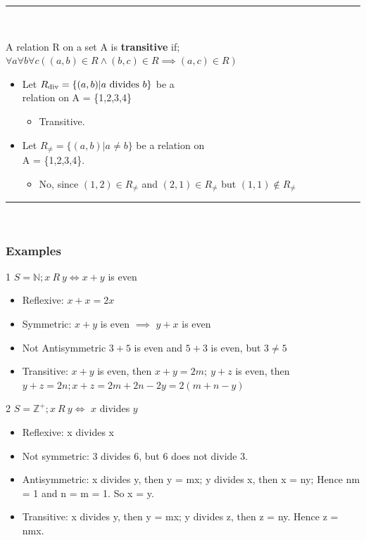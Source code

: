 \documentclass[12pt, letterpaper]{article}
\newcommand{\cul}[1]{%
		\uline{\phantom{#1}}%
		\llap{\contour{white}{#1}}%
	}
\newcommand{\exheader}[1][ex]{{\tiny{#1}\normalsize}}
\newcommand{\horizline}[0]{\noindent\rule{\textwidth}{1pt}\\}
\begin{document}
\horizline
\begin{minipage}[t]{0.5\linewidth}
{\small 
A relation R on a set A is \textbf{transitive} if; \\ $\forall a \forall b \forall c ((a,b) \in R \land (b,c) \in R \implies (a,c) \in R)$
}
\end{minipage}
\begin{minipage}[t]{0.45\textwidth}
{\small 
	\cul{Examples:}
	\begin{itemize}[leftmargin=*, label={}]
		\item Let $R_{\textnormal{div}} = \{(a,b) | a \textnormal{ divides } b\}$ be a \\ relation on A = \{1,2,3,4\}
		\begin{itemize}
			\item Transitive.
		\end{itemize}
		\item Let $R_{\not =} = \{(a,b) | a \not = b\}$ be a relation on \\ A = \{1,2,3,4\}.
		\begin{itemize}
			\item No, since $(1,2) \in R_{\not =}$ and $(2,1) \in R_{\not =}$ but $(1,1) \not \in R_{\not =}$
		\end{itemize}
	\end{itemize}
}
\end{minipage}

\horizline

\pagebreak

\vspace*{-3cm}
\subsubsection*{Examples}
\bigbreak
\exheader[1] $S = \mathbb{N}; x\ R\ y \iff x + y$ is even
\begin{itemize}[leftmargin=*, label={}]
	\item Reflexive: $x + x = 2x$ 
	\item Symmetric: $x + y$ is even $\implies$ $y + x$ is even 
	\item Not Antisymmetric $3 + 5$ is even and $5 + 3$ is even, but $3 \not = 5$ 
	\item Transitive: $x + y$ is even, then $x + y = 2m; \ y + z$ is even, then $y + z = 2n; x + z = 2m + 2n - 2y = 2(m + n -y)$ 
\end{itemize}

\bigbreak

\exheader[2] $S = \mathbb{Z}^+; x\ R\ y \iff$ $x$ divides $y$ 
\begin{itemize}[leftmargin=*, label={}]
	\item Reflexive: x divides x 
	\item Not symmetric: 3 divides 6, but 6 does not divide 3. 
	\item Antisymmetric: x divides y, then y = mx; y divides x, then x = ny; Hence nm = 1 and n = m = 1. So x = y.
	\item Transitive: x divides y, then y = mx; y divides z, then z = ny. Hence z = nmx.
\end{itemize}
\end{document}
